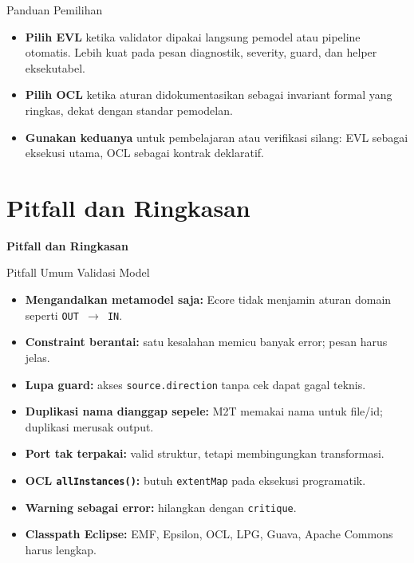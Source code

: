 \documentclass[aspectratio=169, table]{beamer}
\begin{document}
\begin{frame}{Panduan Pemilihan}
\vspace{6pt}
\begin{itemize}
  \item \textbf{Pilih EVL} ketika validator dipakai langsung pemodel atau pipeline otomatis. Lebih kuat pada pesan diagnostik, severity, guard, dan helper eksekutabel.
  \item \textbf{Pilih OCL} ketika aturan didokumentasikan sebagai invariant formal yang ringkas, dekat dengan standar pemodelan.
  \item \textbf{Gunakan keduanya} untuk pembelajaran atau verifikasi silang: EVL sebagai eksekusi utama, OCL sebagai kontrak deklaratif.
\end{itemize}
\end{frame}

\section{Pitfall dan Ringkasan}
\begin{frame}{\hfill}
	\centering
	\Huge{\textbf{Pitfall dan Ringkasan}}
\end{frame}

\begin{frame}{Pitfall Umum Validasi Model}
\vspace{6pt}
\begin{itemize}\small
  \item \textbf{Mengandalkan metamodel saja:} Ecore tidak menjamin aturan domain seperti \texttt{OUT $\rightarrow$ IN}.
  \item \textbf{Constraint berantai:} satu kesalahan memicu banyak error; pesan harus jelas.
  \item \textbf{Lupa guard:} akses \texttt{source.direction} tanpa cek dapat gagal teknis.
  \item \textbf{Duplikasi nama dianggap sepele:} M2T memakai nama untuk file/id; duplikasi merusak output.
  \item \textbf{Port tak terpakai:} valid struktur, tetapi membingungkan transformasi.
  \item \textbf{OCL \texttt{allInstances()}:} butuh \texttt{extentMap} pada eksekusi programatik.
  \item \textbf{Warning sebagai error:} hilangkan dengan \texttt{critique}.
  \item \textbf{Classpath Eclipse:} EMF, Epsilon, OCL, LPG, Guava, Apache Commons harus lengkap.
\end{itemize}
\end{frame}
\end{document}
